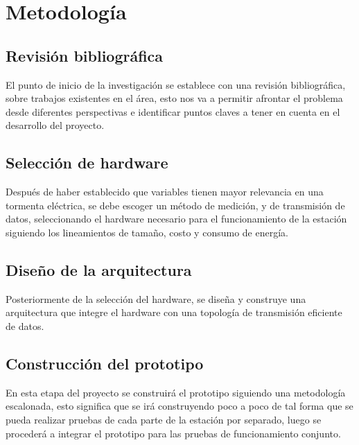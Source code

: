\documentclass[12pt,a4paper,oneside]{book}
\begin{document}
\newpage 

\chapter{Metodología}

\section{\textbf{Revisión bibliográfica}}
El punto de inicio de la investigación se establece con una revisión bibliográfica, sobre trabajos existentes en el área, esto nos va a permitir afrontar el problema desde diferentes perspectivas e identificar puntos claves a tener en cuenta en el desarrollo del proyecto. 
\section{\textbf{Selección de hardware}}
Después de haber establecido que variables tienen mayor relevancia en una tormenta eléctrica, se debe escoger un método de medición, y de transmisión de datos, seleccionando el hardware necesario para el funcionamiento de la estación siguiendo los lineamientos de tamaño, costo y consumo de energía.

\section{\textbf{Diseño de la arquitectura}}
Posteriormente de la selección del hardware, se diseña y construye una arquitectura que integre el hardware con una topología de transmisión eficiente de datos. 
\section{\textbf{Construcción del prototipo}}
En esta etapa del proyecto se construirá el prototipo siguiendo una metodología escalonada, esto significa que se irá construyendo poco a poco de tal forma que se pueda realizar pruebas de cada parte de la estación por separado, luego se procederá a integrar el prototipo para las pruebas de funcionamiento conjunto. 

\end{document}
